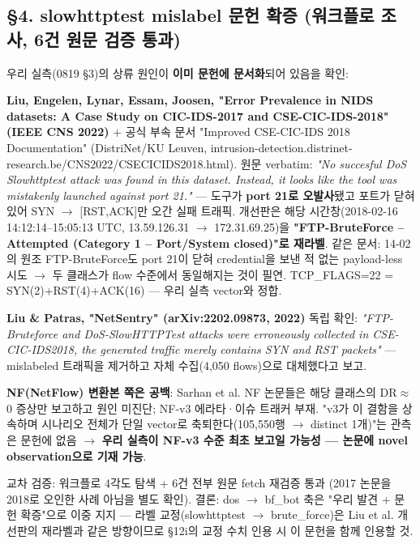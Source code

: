 \subsection{§4. slowhttptest mislabel 문헌 확증 (워크플로 조사, 6건 원문 검증 통과)}
우리 실측(0819 §3)의 상류 원인이 \textbf{이미 문헌에 문서화}되어 있음을 확인:

\par\noindent \textbullet\enspace \textbf{Liu, Engelen, Lynar, Essam, Joosen, "Error Prevalence in NIDS datasets: A Case Study on CIC-IDS-2017 and CSE-CIC-IDS-2018" (IEEE CNS 2022)} +\allowbreak{} 공식 부속 문서 "Improved CSE-CIC-IDS 2018 Documentation" (DistriNet/\allowbreak{}KU Leuven, intrusion-detection.distrinet-research.be/\allowbreak{}CNS2022/\allowbreak{}CSECICIDS2018.html). 원문 verbatim: \emph{"No succesful DoS Slowhttptest attack was found in this dataset. Instead, it looks like the tool was mistakenly launched against port 21."} — 도구가 \textbf{port 21로 오발사}됐고 포트가 닫혀 있어 SYN \ensuremath{\rightarrow} [RST,ACK]만 오간 실패 트래픽. 개선판은 해당 시간창(2018-02-16 14:12:14–15:05:13 UTC, 13.59.126.31 \ensuremath{\rightarrow} 172.31.69.25)을 \textbf{"FTP-BruteForce – Attempted (Category 1 – Port/\allowbreak{}System closed)"로 재라벨}. 같은 문서: 14-02의 원조 FTP-BruteForce도 port 21이 닫혀 credential을 보낸 적 없는 payload-less 시도  \ensuremath{\rightarrow}  두 클래스가 flow 수준에서 동일해지는 것이 필연. TCP\_\allowbreak{}FLAGS=\allowbreak{}22 =\allowbreak{} SYN(2)+\allowbreak{}RST(4)+\allowbreak{}ACK(16) — 우리 실측 vector와 정합.


\par\noindent \textbullet\enspace \textbf{Liu \& Patras, "NetSentry" (arXiv:2202.09873, 2022)} 독립 확인: \emph{"FTP-Bruteforce and DoS-SlowHTTPTest attacks were erroneously collected in CSE-CIC-IDS2018, the generated traffic merely contains SYN and RST packets"} — mislabeled 트래픽을 제거하고 자체 수집(4,050 flows)으로 대체했다고 보고.


\par\noindent \textbullet\enspace \textbf{NF(NetFlow) 변환본 쪽은 공백}: Sarhan et al. NF 논문들은 해당 클래스의 DR\ensuremath{\approx}0 증상만 보고하고 원인 미진단; NF-v3 에라타·이슈 트래커 부재. "v3가 이 결함을 상속하며 시나리오 전체가 단일 vector로 축퇴한다(105,550행  \ensuremath{\rightarrow}  distinct 1개)"는 관측은 문헌에 없음  \ensuremath{\rightarrow}  \textbf{우리 실측이 NF-v3 수준 최초 보고일 가능성 — 논문에 novel observation으로 기재 가능}.


교차 검증: 워크플로 4각도 탐색 +\allowbreak{} 6건 전부 원문 fetch 재검증 통과 (2017 논문을 2018로 오인한 사례 아님을 별도 확인). 결론: dos \ensuremath{\rightarrow} bf\_\allowbreak{}bot 축은 "우리 발견 +\allowbreak{} 문헌 확증"으로 이중 지지 — 라벨 교정(slowhttptest \ensuremath{\rightarrow} brute\_\allowbreak{}force)은 Liu et al. 개선판의 재라벨과 같은 방향이므로 §12i의 교정 수치 인용 시 이 문헌을 함께 인용할 것.


